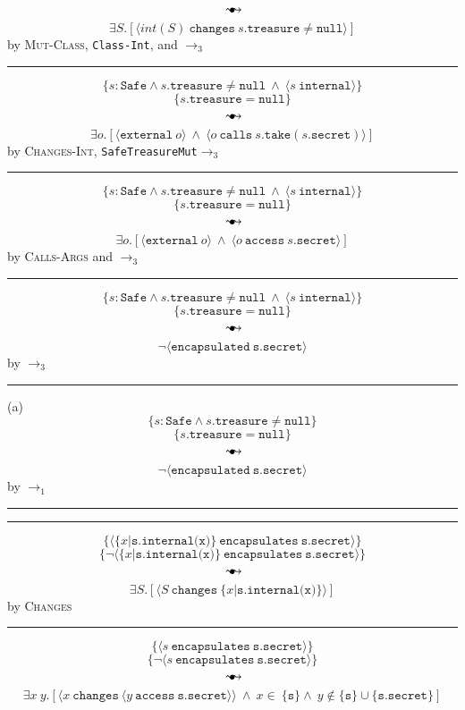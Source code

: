 \documentclass[12pt]{article}
\newcommand\trans{\mathlarger{\mathlarger \leadsto}}
\newcommand\ot{\hspace{2mm}{\raisebox{1pt}{$\bullet$}}\hspace{-3mm}{\trans}}
\newcommand\encapsulated[1]{\langle \texttt{encapsulated}\ #1 \rangle}
\newcommand\encapsulates[2]{\langle #1\ \texttt{encapsulates}\ #2 \rangle}
\newcommand\changes[2]{\langle #1\ \texttt{changes}\ #2 \rangle}
\newcommand\access[2]{\langle #1\ \texttt{access}\ #2 \rangle}
\newcommand\internal[1]{\langle #1\ \texttt{internal}\rangle}
\newcommand\comprehension[2]{\{#1 | #2\}}
\numberwithin{case}{lemma}
\numberwithin{case}{theorem}
\numberwithin{subcase}{case}
\begin{document}
$$\ot$$
$$
	\exists S.[\changes{\textit{int}(S)}{s.\texttt{treasure} \neq \texttt{null}}]
$$
\hfill by \textsc{Mut-Class}, \texttt{Class-Int}, and $\longrightarrow_3$
\hrule
\vspace{3mm}
$$
	\{s : \texttt{Safe} \wedge s.\texttt{treasure} \neq \texttt{null}\ \wedge\ \internal{s}\}
$$
$$
	\{s.\texttt{treasure} = \texttt{null} \}
$$
$$\ot$$
$$
	\exists o. [\langle \texttt{external}\ o \rangle\ \wedge\ \langle o\ \texttt{calls}\ s.\texttt{take}(s.\texttt{secret}) \rangle]
$$
\hfill by \textsc{Changes-Int}, \texttt{SafeTreasureMut}$\longrightarrow_3$\\
\hrule
\vspace{3mm}
$$
	\{s : \texttt{Safe} \wedge s.\texttt{treasure} \neq \texttt{null}\ \wedge\ \internal{s}\}
$$
$$
	\{s.\texttt{treasure} = \texttt{null} \}
$$
$$\ot$$
$$
	\exists o. [\langle \texttt{external}\ o \rangle\ \wedge\ \langle o\ \texttt{access}\ s.\texttt{secret} \rangle]
$$
\hfill by \textsc{Calls-Args} and $\longrightarrow_3$
\hrule
\vspace{3mm}
$$
	\{s : \texttt{Safe} \wedge s.\texttt{treasure} \neq \texttt{null}\ \wedge\ \internal{s}\}
$$
$$
	\{s.\texttt{treasure} = \texttt{null} \}
$$
$$\ot$$
$$
	\neg \encapsulated{\texttt{s.secret}}
$$
\hfill by $\longrightarrow_3$
\hrule
\vspace{3mm}
(a)
$$
	\{s : \texttt{Safe} \wedge s.\texttt{treasure} \neq \texttt{null}\}
$$
$$
	\{s.\texttt{treasure} = \texttt{null} \}
$$
$$\ot$$
$$
	\neg \encapsulated{\texttt{s.secret}}
$$
\hfill by $\longrightarrow_1$
\hrule
\vspace{3mm}
\normalsize
{}
\vspace{3mm}
\footnotesize
\hrule
\vspace{3mm}
$$
	\{\encapsulates{\comprehension{x}{\texttt{s.internal(x)}}}{\texttt{s.secret}} \}
$$
$$
	\{\neg \encapsulates{\comprehension{x}{\texttt{s.internal(x)}}}{\texttt{s.secret}} \}
$$
$$\ot$$
$$
	\exists S.[\changes{S}{\comprehension{x}{\texttt{s.internal(x)}}}]
$$
\hfill by \textsc{Changes}
\hrule
\vspace{3mm}
$$
	\{\encapsulates{s}{\texttt{s.secret}} \}
$$
$$
	\{\neg \encapsulates{s}{\texttt{s.secret}} \}
$$
$$\ot$$
$$
	\exists x\ y.[\changes{x}{\access{y}{\texttt{s.secret}}}\ \wedge\ x \in\ \{\texttt{s}\} \wedge\ y \not\in \{\texttt{s}\} \cup \{\texttt{s.secret}\}]
$$
\end{document}
